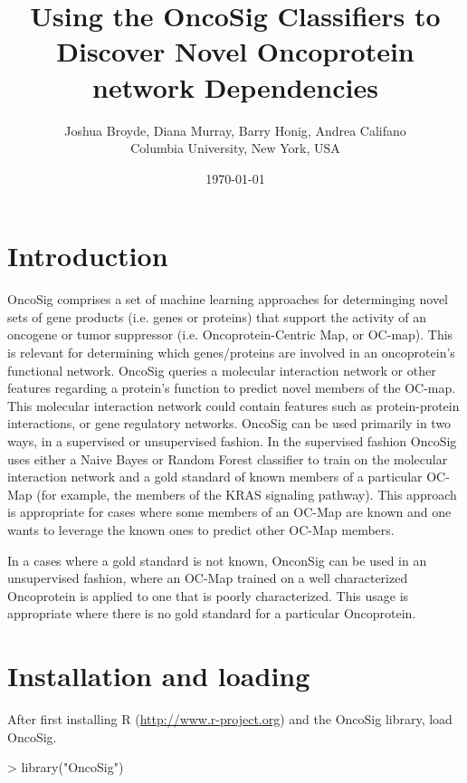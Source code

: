 \documentclass{article}
\title{Using the OncoSig Classifiers to Discover Novel Oncoprotein network Dependencies}
\date{\today}
\begin{document}
\author{Joshua Broyde, Diana Murray, Barry Honig, Andrea Califano\\Columbia University, New York, USA}

\maketitle

\section*{Introduction}

OncoSig comprises a set of machine learning approaches for determinging novel sets of gene products (i.e. genes or proteins) that support
the activity of an oncogene or tumor suppressor (i.e. Oncoprotein-Centric Map,
or OC-map). This is relevant for determining which genes/proteins are involved in an oncoprotein's functional network. OncoSig queries a molecular interaction network or other features regarding a protein's function to predict novel members of the OC-map. This molecular interaction network could contain features such as protein-protein interactions, or gene regulatory networks.
OncoSig can be used primarily in two ways, in a supervised or unsupervised fashion. In the supervised fashion OncoSig uses either a Naive Bayes or Random Forest classifier to train on the molecular interaction network and a gold standard of known members of a particular OC-Map (for example, the members of the KRAS signaling pathway). This approach is appropriate for cases where some members of an OC-Map are known and one wants to leverage the known ones to predict other OC-Map members.

In a cases where a gold standard is not known, OnconSig can be used in an unsupervised fashion, where an OC-Map trained on a well characterized Oncoprotein is applied to one that is poorly characterized. This usage is appropriate where there is no gold standard for a particular Oncoprotein.

\section*{Installation and loading}
After first installing R (\href{url}{http://www.r-project.org}) and the OncoSig library, load OncoSig.
\begin{Schunk}
\begin{Sinput}
> library("OncoSig")
\end{Sinput}
\end{Schunk}
\end{document}
